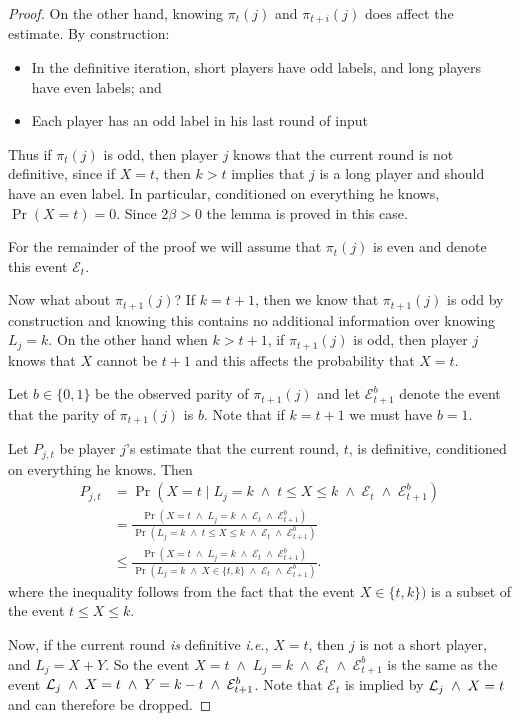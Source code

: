 \documentclass[12pt]{article}
\theoremstyle{definition}
\newcommand{\ie}{\emph{i.e.}}
\newcommand{\sand}{\;\land\;}
\newcommand{\Pjt}{P_{j,t}}
\begin{document}
\begin{proof}
On the other hand, knowing $\pi_t(j)$ and $\pi_{t+i}(j)$ does affect the 
estimate. By construction:
\begin{itemize}
\item In the definitive iteration, short players have odd labels, and 
long players have even labels; and
\item Each player has an odd label in his last round of input 
\end{itemize}
Thus if $\pi_t(j)$ is odd, then player $j$ knows that the current round is not
definitive, since if $X=t$, then $k>t$ implies that $j$ is a long player 
and should have an even label.  In particular, conditioned on everything he knows, 
$\Pr(X=t)=0$. Since $2\beta > 0$ the lemma is proved in this case.

\newcommand{\EEE}{\mathcal{E}_t}
\newcommand{\EEEE}{\mathcal{E}^{b}_{t+1}}

For the remainder of the proof we will assume that $\pi_t(j)$ is even
and denote this event $\EEE$.


Now what about $\pi_{t+1}(j)$? If $k=t+1$, then we know that $\pi_{t+1}(j)$ 
is odd by construction and knowing this contains no additional information 
over knowing $L_j=k$. On the other hand when $k>t+1$, if $\pi_{t+1}(j)$ 
is odd, then player $j$ knows that $X$ cannot be $t+1$ and this affects the 
probability that $X=t$.

Let $b \in \{ 0, 1\}$ be the observed parity of $\pi_{t+1}(j)$ and let 
$\EEEE$ denote the event that the 
parity of $\pi_{t+1}(j)$ is $b$. Note that if $k=t+1$ we must have 
$b=1$.


Let $\Pjt$ be player $j$'s estimate that the current round, 
$t$, is definitive, conditioned on everything he knows. Then
\begin{align*}
\Pjt &= \Pr(X=t \;|\; L_j=k \sand t\le X \le k \sand \EEE \sand \EEEE)\\
&=\frac{\Pr(X=t \sand L_j=k \sand \EEE \sand \EEEE)}
{\Pr(L_j=k \sand t\le X \le k \sand \EEE \sand \EEEE)}\\
&\le \frac{\Pr(X=t \sand L_j=k \sand \EEE \sand \EEEE)}
{\Pr(L_j=k \sand X \in \{t,k\} \sand \EEE \sand \EEEE)}.
\end{align*}
where the inequality follows from the fact that the event $X \in \{t,k\})$ is a subset of the event $t\le X \le k$.

Now, if the current round \emph{is} definitive \ie, $X=t$, then $j$ is not 
a short player, and $L_j=X+Y$. So the event $X=t \sand L_j = k 
\sand \EEE \sand \EEEE$ is the same as the event $\longp \sand
X=t \sand Y=k-t \sand \EEEE$.   Note that $\EEE$ is 
implied  by $\longp \sand X=t$ and can therefore be dropped.


\end{proof}
\end{document}
